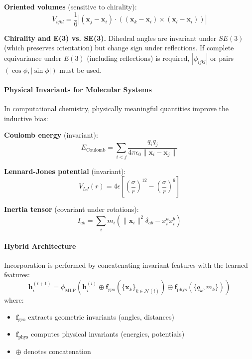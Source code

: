 \textbf{Oriented volumes} (sensitive to chirality):
\begin{equation}
V_{ijkl} = \frac{1}{6} \left|(\mathbf{x}_j - \mathbf{x}_i) \cdot \left((\mathbf{x}_k - \mathbf{x}_i) \times (\mathbf{x}_l - \mathbf{x}_i)\right)\right|
\end{equation}

\textbf{Chirality and E(3) vs. SE(3).} Dihedral angles are invariant under $SE(3)$ (which preserves orientation) but change sign under reflections. If complete equivariance under $E(3)$ (including reflections) is required, $|\phi_{ijkl}|$ or pairs $(\cos \phi, |\sin \phi|)$ must be used.

\paragraph{Physical Invariants for Molecular Systems}

In computational chemistry, physically meaningful quantities improve the inductive bias:

\textbf{Coulomb energy} (invariant):
\begin{equation}
E_{\text{Coulomb}} = \sum_{i < j} \frac{q_i q_j}{4\pi \epsilon_0 \|\mathbf{x}_i - \mathbf{x}_j\|}
\end{equation}

\textbf{Lennard-Jones potential} (invariant):
\begin{equation}
V_{LJ}(r) = 4\epsilon \left[\left(\frac{\sigma}{r}\right)^{12} - \left(\frac{\sigma}{r}\right)^6\right]
\end{equation}

\textbf{Inertia tensor} (covariant under rotations):
\begin{equation}
I_{ab} = \sum_i m_i \left(\|\mathbf{x}_i\|^2 \delta_{ab} - x_i^a x_i^b\right)
\end{equation}

\paragraph{Hybrid Architecture}

Incorporation is performed by concatenating invariant features with the learned features:
\begin{equation}
\mathbf{h}_i^{(l+1)} = \phi_{\text{MLP}}\left(\mathbf{h}_i^{(l)} \oplus \mathbf{f}_{\text{geo}}(\{\mathbf{x}_k\}_{k \in \mathcal{N}(i)}) \oplus \mathbf{f}_{\text{phys}}(\{q_k, m_k\})\right)
\end{equation}
where:
\begin{itemize}
    \item $\mathbf{f}_{\text{geo}}$ extracts geometric invariants (angles, distances)
    \item $\mathbf{f}_{\text{phys}}$ computes physical invariants (energies, potentials)
    \item $\oplus$ denotes concatenation
\end{itemize}

